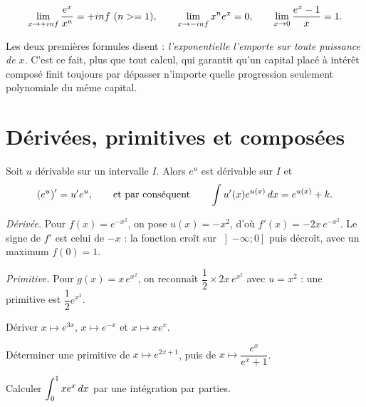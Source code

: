 \begin{theoreme}
\[
  \limpinf \frac{e^{x}}{x^{n}} = +\infty \ (n \geq 1), \qquad
  \limminf x^{n}e^{x} = 0,
  \qquad
  \lim_{x \to 0}\frac{e^{x}-1}{x} = 1 .
\]
\end{theoreme}

\begin{remarque}
Les deux premières formules disent : \emph{l'exponentielle l'emporte sur
toute puissance de $x$}. C'est ce fait, plus que tout calcul, qui garantit
qu'un capital placé à intérêt composé finit toujours par dépasser n'importe
quelle progression seulement polynomiale du même capital.
\end{remarque}

\section{Dérivées, primitives et composées}

\begin{theoreme}
Soit $u$ dérivable sur un intervalle $I$. Alors $e^{u}$ est dérivable sur $I$
et
\[
  \left(e^{u}\right)' = u'e^{u}, \qquad\text{et par conséquent}\qquad
  \int u'(x)e^{u(x)}\,dx = e^{u(x)} + k .
\]
\end{theoreme}

\begin{exemple}
\emph{Dérivée.} Pour $f(x) = e^{-x^{2}}$, on pose $u(x) = -x^{2}$, d'où
$f'(x) = -2x\,e^{-x^{2}}$. Le signe de $f'$ est celui de $-x$ : la fonction
croît sur $\left]-\infty;0\right]$ puis décroît, avec un maximum $f(0) = 1$.

\smallskip
\emph{Primitive.} Pour $g(x) = x\,e^{x^{2}}$, on reconnaît
$\dfrac{1}{2}\times 2x\,e^{x^{2}}$ avec $u = x^{2}$ : une primitive est
$\dfrac{1}{2}e^{x^{2}}$.
\end{exemple}

\begin{entrainement}
\exo[\niveau{1}] Dériver $x \mapsto e^{3x}$, $x \mapsto e^{-x}$ et
$x \mapsto xe^{x}$.

\exo[\niveau{2}] Déterminer une primitive de $x \mapsto e^{2x+1}$, puis de
$x \mapsto \dfrac{e^{x}}{e^{x}+1}$.

\exo[\niveau{3}] Calculer $\displaystyle\int_{0}^{1} xe^{x}\,dx$ par une
intégration par parties.
\end{entrainement}

